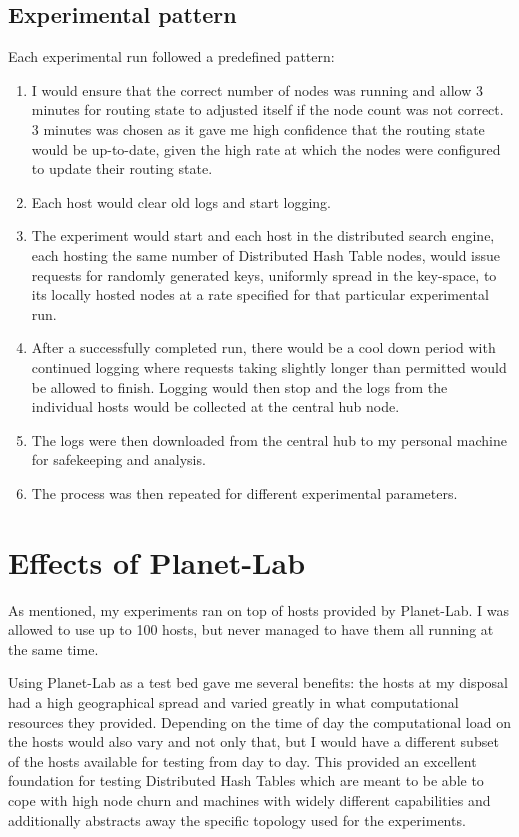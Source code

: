 \subsection{Experimental pattern}
Each experimental run followed a predefined pattern:
\begin{enumerate}
\item I would ensure that the correct number of nodes was running and allow 3 minutes for routing state to adjusted itself if the node count was not correct. 3 minutes was chosen as it gave me high confidence that the routing state would be up-to-date, given the high rate at which the nodes were configured to update their routing state.
\item Each host would clear old logs and start logging.
\item The experiment would start and each host in the distributed search engine, each hosting the same number of Distributed Hash Table nodes, would issue requests for randomly generated keys, uniformly spread in the key-space, to its locally hosted nodes at a rate specified for that particular experimental run.
\item After a successfully completed run, there would be a cool down period with continued logging where requests taking slightly longer than permitted would be allowed to finish. Logging would then stop and the logs from the individual hosts would be collected at the central hub node.
\item The logs were then downloaded from the central hub to my personal machine for safekeeping and analysis.
\item The process was then repeated for different experimental parameters.
\end{enumerate}

\section{Effects of Planet-Lab}
As mentioned, my experiments ran on top of hosts provided by Planet-Lab. I was allowed to use up to 100 hosts, but never managed to have them all running at the same time.

Using Planet-Lab as a test bed gave me several benefits: the hosts at my disposal had a high geographical spread and varied greatly in what computational resources they provided. Depending on the time of day the computational load on the hosts would also vary and not only that, but I would have a different subset of the hosts available for testing from day to day.
This provided an excellent foundation for testing Distributed Hash Tables which are meant to be able to cope with high node churn and machines with widely different capabilities and additionally abstracts away the specific topology used for the experiments.

